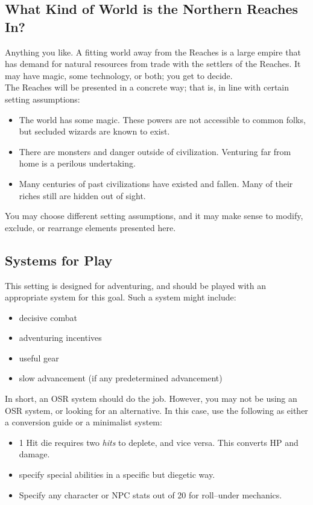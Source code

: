 \documentclass[notitlepage]{article}
\begin{document}
\begin{multicols*}{2}
\subsection*{What Kind of World is the Northern Reaches In?}

Anything you like.
A fitting world away from the Reaches is a large empire that has demand for natural resources from trade with the settlers of the Reaches.
It may have magic, some technology, or both; you get to decide. \\

The Reaches will be presented in a concrete way; that is, in line with certain setting assumptions:

\begin{itemize}
\item The world has some magic. These powers are not accessible to common folks, but secluded wizards are known to exist.
\item There are monsters and danger outside of civilization. Venturing far from home is a perilous undertaking.
\item Many centuries of past civilizations have existed and fallen. Many of their riches still are hidden out of sight. 
\end{itemize}

You may choose different setting assumptions, and it may make sense to modify, exclude, or rearrange elements presented here.


\subsection*{Systems for Play}

This setting is designed for adventuring, and should be played with an appropriate system for this goal.
Such a system might include:

\begin{itemize}
\item decisive combat
\item adventuring incentives
\item useful gear
\item slow advancement (if any predetermined advancement)
\end{itemize}

In short, an OSR system should do the job.
However, you may not be using an OSR system, or looking for an alternative.
In this case, use the following as either a conversion guide or a minimalist system:

\begin{itemize}
\item 1 Hit die requires two \emph{hits} to deplete, and vice versa. This converts HP and damage.
\item specify special abilities in a specific but diegetic way.
\item Specify any character or NPC stats out of 20 for roll--under mechanics.
\end{itemize}


\end{multicols*}
\end{document}
